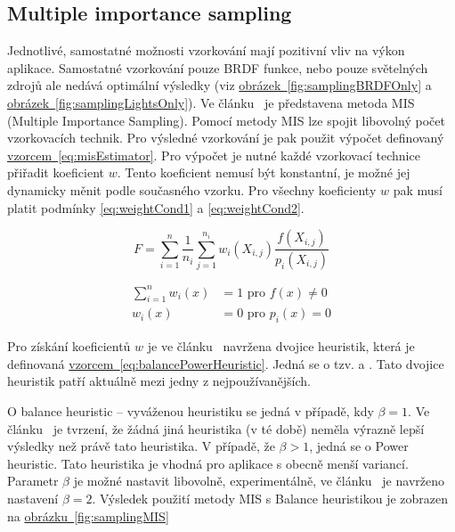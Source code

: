 \documentclass[czech,master]{diploma}
\begin{document}
\subsection{Multiple importance sampling}
Jednotlivé, samostatné možnosti vzorkování mají pozitivní vliv na výkon aplikace. Samostatné vzorkování pouze BRDF funkce, nebo pouze světelných zdrojů ale nedává optimální výsledky (viz \hyperref[fig:samplingBRDFOnly]{obrázek~\ref{fig:samplingBRDFOnly}} a \hyperref[fig:samplingLightsOnly]{obrázek~\ref{fig:samplingLightsOnly}}). Ve článku~\cite{Guibas1997RobustMC} je představena metoda MIS (Multiple Importance Sampling). Pomocí metody MIS lze spojit libovolný počet vzorkovacích technik. Pro výsledné vzorkování je pak použit výpočet definovaný \hyperref[eq:misEstimator]{vzorcem~\ref{eq:misEstimator}}. Pro výpočet je nutné každé vzorkovací technice přiřadit koeficient \(w\). Tento koeficient nemusí být konstantní, je možné jej dynamicky měnit podle současného vzorku. Pro všechny koeficienty \(w\) pak musí platit podmínky \hyperref[eq:weightCond1]{\ref{eq:weightCond1}} a  \hyperref[eq:weightCond2]{\ref{eq:weightCond2}}.

\begin{equation} \label{eq:misEstimator}
  F = \sum^{n}_{i=1}\frac{1}{n_i}\sum^{n_i}_{j=1}w_i(X_{i,j})\frac{f(X_{i,j})}{p_i(X_{i,j})}
\end{equation}

\begin{align}
  \sum^{n}_{i=1}w_i(x) & = 1 \text{~pro~}f\left( x \right) \neq 0 \label{eq:weightCond1} \\
  w_i\left( x \right)  & = 0 \text{~pro~}p_i\left( x \right) = 0 \label{eq:weightCond2}
\end{align}

Pro získání koeficientů \(w\) je ve článku~\cite{Guibas1997RobustMC} navržena dvojice heuristik, která je definovaná \hyperref[eq:balancePowerHeuristic]{vzorcem~\ref{eq:balancePowerHeuristic}}. Jedná se o tzv.  a . Tato dvojice heuristik patří aktuálně mezi jedny z nejpoužívanějších.\par
O balance heuristic -- vyváženou heuristiku se jedná v případě, kdy \(\beta = 1\). Ve článku~\cite{Guibas1997RobustMC} je tvrzení, že žádná jiná heuristika (v té době) neměla výrazně lepší výsledky než právě tato heuristika. V případě, že \(\beta > 1\), jedná se o Power heuristic. Tato heuristika je vhodná pro aplikace s obecně menší variancí. Parametr \(\beta\) je možné nastavit libovolně, experimentálně, ve článku~\cite{Guibas1997RobustMC} je navrženo nastavení \(\beta = 2\). Výsledek použití metody MIS s Balance heuristikou je zobrazen na \hyperref[fig:samplingMIS]{obrázku~\ref{fig:samplingMIS}}
\end{document}
